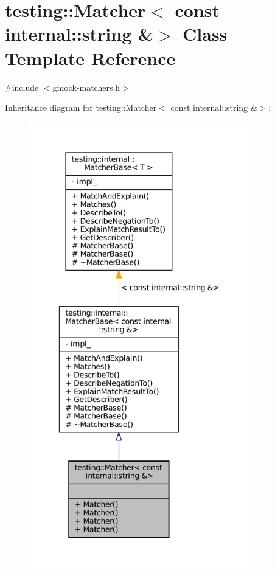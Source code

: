 \hypertarget{classtesting_1_1Matcher_3_01const_01internal_1_1string_01_6_4}{}\section{testing\+:\+:Matcher$<$ const internal\+:\+:string \&$>$ Class Template Reference}
\label{classtesting_1_1Matcher_3_01const_01internal_1_1string_01_6_4}


{\ttfamily \#include $<$gmock-\/matchers.\+h$>$}



Inheritance diagram for testing\+:\+:Matcher$<$ const internal\+:\+:string \&$>$\+:
\nopagebreak
\begin{figure}[H]
\begin{center}
\leavevmode
\includegraphics[height=550pt]{classtesting_1_1Matcher_3_01const_01internal_1_1string_01_6_4__inherit__graph}
\end{center}
\end{figure}


